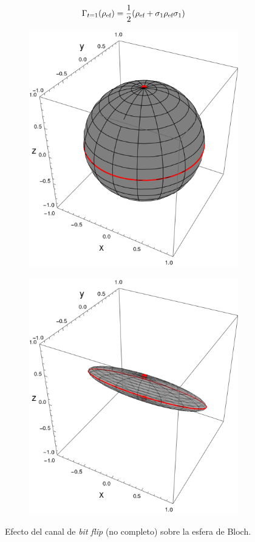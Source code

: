 \begin{equation*}
  \Gamma_{t=1}(\rho_{\text{ef}})=\frac{1}{2}\qty(\rho_{\text{ef}}+\sigma_{1}\rho_{\text{ef}}\sigma_{1})
\end{equation*}
\begin{figure}[ht!]
  \centering
  \begin{subfigure}{0.5\textwidth}
    \centering
    \includegraphics[width=0.6\linewidth]{chapter3/figures_toy/sphere_swapcontraction_t=0.0_z=0.9_p=0.9.png}
  \end{subfigure}%
  \begin{subfigure}{0.5\textwidth}
    \centering
    \includegraphics[width=0.6\linewidth]{chapter3/figures_toy/sphere_BitF_t=1.0_z=0.8_p=0.6.png}
  \end{subfigure}
  \caption{Efecto del canal de \textit{bit flip} (no completo) sobre la esfera de Bloch.}\label{fig:BitFlip}
\end{figure}

